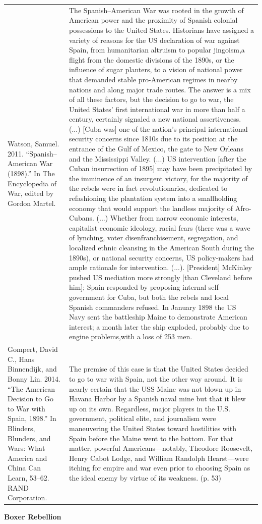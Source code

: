 {\begin{longtable}{p{}p{}}
Watson, Samuel. 2011. “Spanish–American War (1898).” In The Encyclopedia of War, edited by Gordon Martel. & The Spanish–American War was rooted in the growth of American power and the proximity of Spanish colonial possessions to the United States. Historians have assigned a variety of reasons for the US declaration of war against Spain, from humanitarian altruism to popular jingoism,a flight from the domestic divisions of the 1890s, or the influence of sugar planters, to a vision of national power that demanded stable pro-American regimes in nearby nations and along major trade routes. The answer is a mix of all these factors, but the decision to go to war, the United States' first international war in more than half a century, certainly signaled a new national assertiveness. (...) [Cuba was] one of the nation's principal international security concerns since 1810s due to its position at the entrance of the Gulf of Mexico, the gate to New Orleans and the Mississippi Valley. (...) US intervention [after the Cuban insurrection of 1895] may have been precipitated by the imminence of an insurgent victory, for the majority of the rebels were in fact revolutionaries, dedicated to refashioning the plantation system into a smallholding economy that would support the landless majority of Afro-Cubans. (...) Whether from narrow economic interests, capitalist economic ideology, racial fears (there was a wave of lynching, voter disenfranchisement, segregation, and localized ethnic cleansing in the American South during the 1890s), or national security concerns, US policy-makers had ample rationale for intervention. (...). [President] McKinley pushed US mediation more strongly [than Cleveland before him]; Spain responded by proposing internal self-government for Cuba, but both the rebels and local Spanish commanders refused. In January 1898 the US Navy sent the battleship Maine to demonstrate American interest; a month later the ship exploded, probably due to engine problems,with a loss of 253 men. 
\\
Gompert, David C., Hans Binnendijk, and Bonny Lin. 2014. “The American Decision to Go to War with Spain, 1898.” In Blinders, Blunders, and Wars: What America and China Can Learn, 53–62. RAND Corporation. & The premise of this case is that the United States decided to go to war with Spain, not the other way around. It is nearly certain that the USS Maine was not blown up in Havana Harbor by a Spanish naval mine but that it blew up on its own. Regardless, major players in the U.S. government, political elite, and journalism were maneuvering the United States toward hostilities with Spain before the Maine went to the bottom. For that matter, powerful Americans—notably, Theodore Roosevelt, Henry Cabot Lodge, and William Randolph Hearst—were itching for empire and war even prior to choosing Spain as the ideal enemy by virtue of its weakness. (p. 53)
\\
\end{longtable}}
\clearpage
         \textbf{Boxer Rebellion} 

